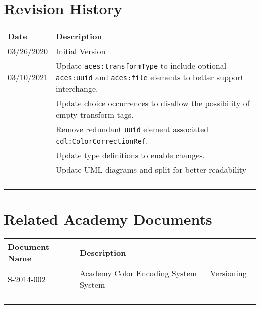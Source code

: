\prelimsectionformat	%
\chapter{Revision History}

\begin{tabularx}{\linewidth}{|l|X|}
    \hline
    Date       & Description \\ \hline
    03/26/2020 & Initial Version \\ \hline
    03/10/2021 & Update \texttt{aces:transformType} to include optional \texttt{aces:uuid} and \texttt{aces:file} elements to better support interchange. \\
    	 & Update choice occurrences to disallow the possibility of empty transform tags. \\
    	 & Remove redundant \texttt{uuid} element associated  \texttt{cdl:ColorCorrectionRef}. \\
    	 & Update type definitions to enable changes. \\
    	 & Update UML diagrams and split for better readability \\ \hline
	&  \\ \hline
    &   \\ \hline
    &   \\ \hline
    &   \\ \hline
\end{tabularx}

\vspace{0.25in} %
\chapter{Related Academy Documents} %
\begin{tabularx}{\linewidth}{|l|X|}
    \hline
    Document Name & Description \\ \hline
    S-2014-002 & Academy Color Encoding System --- Versioning System\\ \hline
    & \\ \hline
    & \\ \hline
    & \\ \hline
    & \\ \hline
\end{tabularx}